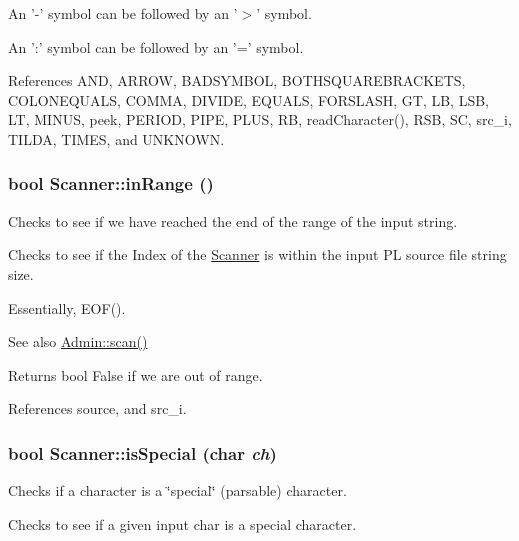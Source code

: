 An '-\/' symbol can be followed by an '$>$' symbol.

An ':' symbol can be followed by an '=' symbol. 



References AND, ARROW, BADSYMBOL, BOTHSQUAREBRACKETS, COLONEQUALS, COMMA, DIVIDE, EQUALS, FORSLASH, GT, LB, LSB, LT, MINUS, peek, PERIOD, PIPE, PLUS, RB, readCharacter(), RSB, SC, src\_\-i, TILDA, TIMES, and UNKNOWN.

\hypertarget{classScanner_a8c4ee8c91d2e7d9ab06c8dc6e86c4ca4}{
\subsubsection[{inRange}]{\setlength{\rightskip}{0pt plus 5cm}bool Scanner::inRange ()}}
\label{classScanner_a8c4ee8c91d2e7d9ab06c8dc6e86c4ca4}


Checks to see if we have reached the end of the range of the input string. 

Checks to see if the Index of the \hyperlink{classScanner}{Scanner} is within the input PL source file string size.

Essentially, EOF().

\begin{DoxySeeAlso}{See also}
\hyperlink{classAdmin_aaa4f711e8151dceab8d90c5f127c6820}{Admin::scan()} 
\end{DoxySeeAlso}
\begin{DoxyReturn}{Returns}
bool False if we are out of range. 
\end{DoxyReturn}


References source, and src\_\-i.

\hypertarget{classScanner_afd047e2ead94064418395668a2c85253}{
\subsubsection[{isSpecial}]{\setlength{\rightskip}{0pt plus 5cm}bool Scanner::isSpecial (char {\em ch})}}
\label{classScanner_afd047e2ead94064418395668a2c85253}


Checks if a character is a \char`\"{}special\char`\"{} (parsable) character. 

Checks to see if a given input char is a special character.

